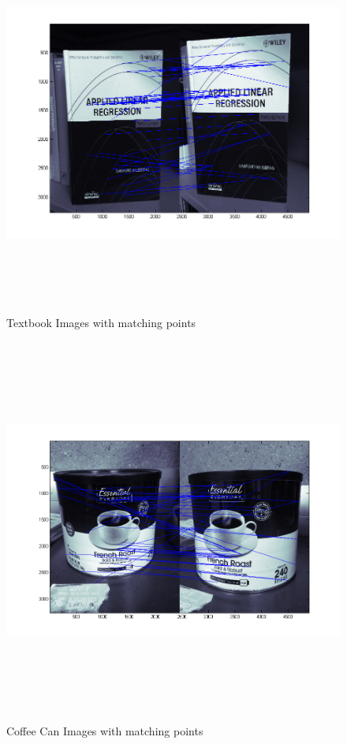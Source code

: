 \documentclass[11pt,psfig]{article}
\begin{document}
\begin{figure}[H]
\centering
\includegraphics[height=5in]{book_prob2Matches2.png}
\caption{Textbook Images with matching points}
\label{p2e}
\end{figure}

\begin{figure}[H]
\centering
\includegraphics[height=5in]{coffeeCan_prob2Matches2.png}
\caption{Coffee Can Images with matching points}
\label{p2f}
\end{figure}
\end{document}
